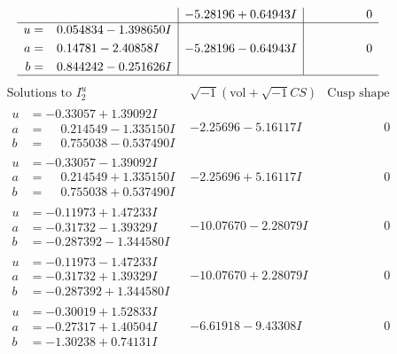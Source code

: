 \documentclass[1p]{elsarticle_modified}
\theoremstyle{definition}
\newcommand{\I}{\sqrt{-1}}
\begin{document}
$$\begin{array}{c|c|c}
 & -5.28196 + 0.64943 I & \phantom{-0.000000 } 0 \\ \hline\begin{aligned}
u &= \phantom{-}0.054834 - 1.398650 I \\
a &= \phantom{-}0.14781 - 2.40858 I \\
b &= \phantom{-}0.844242 - 0.251626 I\end{aligned}
 & -5.28196 - 0.64943 I & \phantom{-0.000000 } 0\\
 \hline 
 \end{array}$$\newpage$$\begin{array}{c|c|c}  
\text{Solutions to }I^u_{2}& \I (\text{vol} + \sqrt{-1}CS) & \text{Cusp shape}\\
 \hline 
\begin{aligned}
u &= -0.33057 + 1.39092 I \\
a &= \phantom{-}0.214549 - 1.335150 I \\
b &= \phantom{-}0.755038 - 0.537490 I\end{aligned}
 & -2.25696 - 5.16117 I & \phantom{-0.000000 } 0 \\ \hline\begin{aligned}
u &= -0.33057 - 1.39092 I \\
a &= \phantom{-}0.214549 + 1.335150 I \\
b &= \phantom{-}0.755038 + 0.537490 I\end{aligned}
 & -2.25696 + 5.16117 I & \phantom{-0.000000 } 0 \\ \hline\begin{aligned}
u &= -0.11973 + 1.47233 I \\
a &= -0.31732 - 1.39329 I \\
b &= -0.287392 - 1.344580 I\end{aligned}
 & -10.07670 - 2.28079 I & \phantom{-0.000000 } 0 \\ \hline\begin{aligned}
u &= -0.11973 - 1.47233 I \\
a &= -0.31732 + 1.39329 I \\
b &= -0.287392 + 1.344580 I\end{aligned}
 & -10.07670 + 2.28079 I & \phantom{-0.000000 } 0 \\ \hline\begin{aligned}
u &= -0.30019 + 1.52833 I \\
a &= -0.27317 + 1.40504 I \\
b &= -1.30238 + 0.74131 I\end{aligned}
 & -6.61918 - 9.43308 I & \phantom{-0.000000 } 0 \\ \hline\begin{aligned}

\end{aligned}
\end{array}$$
\end{document}
